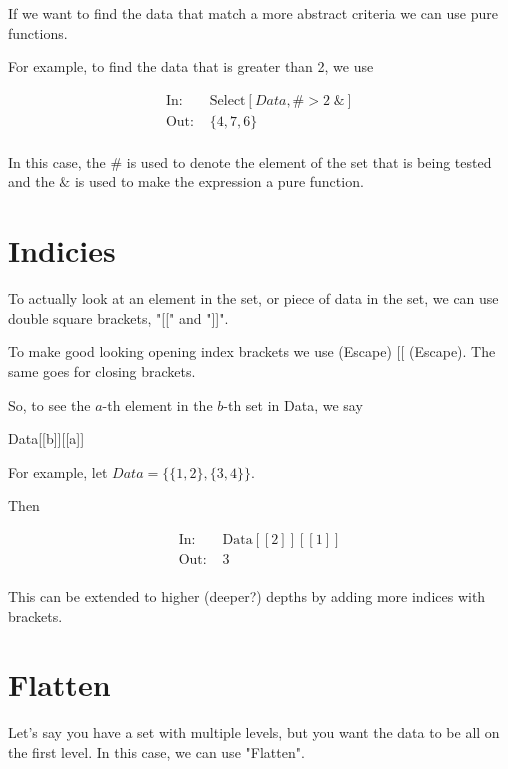 \documentclass[11pt,letterpaper,twoside,titlepage]{report}
\begin{document}
				If we want to find the data that match a more abstract criteria we can use pure functions.
					
				For example, to find the data that is greater than 2, we use
					
					\begin{align*}					
						\text{In: }& \text{Select} [Data,\# > 2 \; \& ] \\
						\text{Out: }& \{ 4,7,6 \} \\
					\end{align*}
					
				In this case, the $ \# $ is used to denote the element of the set that is being tested and the $ \& $ is used to make the expression a pure function.
					
			\section{Indicies}
				
				To actually look at an element in the set, or piece of data in the set, we can use double square brackets, "[[" and "]]".
					
				To make good looking opening index brackets we use (Escape) [[ (Escape).  The same goes for closing brackets.
					
				So, to see the $a$-th element in the $b$-th set in Data, we say
					
				\begin{center} Data[[b]][[a]] \end{center}
					
				For example, let $ Data = \{ \{ 1,2 \} , \{ 3,4 \} \} $.
					
				Then 
					
				\begin{align*}
					\text{In: }& \text{Data}[[2]][[1]] \\
					\text{Out: }& 3 \\
				\end{align*}
					
					This can be extended to higher (deeper?) depths by adding more indices with brackets.
					
			\section{Flatten}
					
				Let's say you have a set with multiple levels, but you want the data to be all on the first level.  In this case, we can use "Flatten".
				
\end{document}
